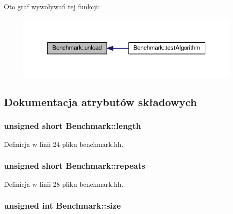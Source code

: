 Oto graf wywoływań tej funkcji\-:
\nopagebreak
\begin{figure}[H]
\begin{center}
\leavevmode
\includegraphics[width=344pt]{class_benchmark_a2dcfb6ee9e648ae88d8c131b2b191bed_icgraph}
\end{center}
\end{figure}




\subsection{Dokumentacja atrybutów składowych}
\hypertarget{class_benchmark_a087c54914ceb80aba52c58136ae20f7e}{
\subsubsection[{length}]{\setlength{\rightskip}{0pt plus 5cm}unsigned short Benchmark\-::length\hspace{0.3cm}{\ttfamily [private]}}}\label{class_benchmark_a087c54914ceb80aba52c58136ae20f7e}


Definicja w linii 24 pliku benchmark.\-hh.

\hypertarget{class_benchmark_afe755071bf6217d77ccba5d727709638}{
\subsubsection[{repeats}]{\setlength{\rightskip}{0pt plus 5cm}unsigned short Benchmark\-::repeats\hspace{0.3cm}{\ttfamily [private]}}}\label{class_benchmark_afe755071bf6217d77ccba5d727709638}


Definicja w linii 28 pliku benchmark.\-hh.

\hypertarget{class_benchmark_a7e989579d9ce0c5ed136a2cbeb83b5b8}{
\subsubsection[{size}]{\setlength{\rightskip}{0pt plus 5cm}unsigned int Benchmark\-::size\hspace{0.3cm}{\ttfamily [private]}}}\label{class_benchmark_a7e989579d9ce0c5ed136a2cbeb83b5b8}


